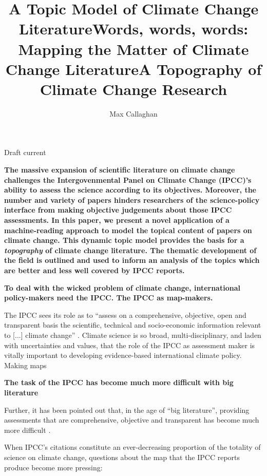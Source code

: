 \documentclass{article}
\title{A Topic Model of Climate Change Literature}
\title{Words, words, words: Mapping the Matter of Climate Change Literature}
\title{A Topography of Climate Change Research}
\author[1,2]{Max Callaghan}
\affil[1]{Mercator Research Institute on Global Commons and Climate Change, Torgauer Straße, 10829 Berlin, Germany}
\affil[2]{School of Earth and Environment, University of Leeds, Leeds LS2 9JT, United Kingdom}
\makeatletter
\renewcommand{\maketitle}{\bgroup\setlength{\parindent}{0pt}
	\begin{flushleft}

		{\huge\textbf{\@title}}

		\bigskip

 		{\large\textbf{\@author}}

 		\bigskip

 		{\large{Draft current \@date}}

	\end{flushleft}\egroup
}
\newcommand{\multicollinenumbers}{
	\linenumbers
	\def\makeLineNumber{\docolaction
		{\makeLineNumberLeft}
		{}
		{\makeLineNumberRight}
		}
}
\makeatother
\begin{document}
\maketitle


\begin{linenumbers}

\noindent\textbf{
The massive expansion of scientific literature on climate change challenges the Intergovenmental Panel on Climate Change (IPCC)'s ability to assess the science according to its objectives.
Moreover, the number and variety of papers hinders researchers of the science-policy interface from making objective judgements about those IPCC assessments. In this paper, we present a novel application of a machine-reading approach to model the topical content of papers on climate change. This dynamic topic model provides the basis for a \textit{topography} of climate change literature. The thematic development of the field is outlined and used to inform an analysis of the topics which are better and less well covered by IPCC reports.
}



\bigskip


\bigskip
\noindent\textbf{To deal with the wicked problem of climate change, international policy-makers need the IPCC. The IPCC as map-makers.}

The IPCC sees its role as to ``assess on a comprehensive, objective, open and transparent basis the scientific, technical and socio-economic information relevant to [...] climate change'' \citep{IPCC2013}. Climate science is so broad, multi-disciplinary, and laden with uncertainties and values, that the role of the IPCC as assessment maker is vitally important to developing evidence-based international climate policy.
Making maps \citep{Edenhofer2015}



\bigskip
\noindent\textbf{The task of the IPCC has become much more difficult with big literature}

Further, it has been pointed out that, in the age of ``big literature'', providing assessments that are comprehensive, objective and transparent has become much more difficult \citep{Minx2017l}.

When IPCC's citations constitute an ever-decreasing proportion of the totality of science on climate change, questions about the map that the IPCC reports produce become more pressing:


\end{linenumbers}
\end{document}
